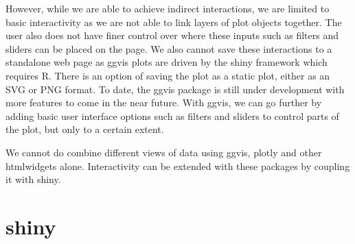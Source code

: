 \documentclass[11pt,]{report}
\newenvironment{Shaded}{\begin{snugshade}}{\end{snugshade}}
\newcommand{\KeywordTok}[1]{\textcolor[rgb]{0.13,0.29,0.53}{\textbf{#1}}}
\newcommand{\DataTypeTok}[1]{\textcolor[rgb]{0.13,0.29,0.53}{#1}}
\newcommand{\DecValTok}[1]{\textcolor[rgb]{0.00,0.00,0.81}{#1}}
\newcommand{\FloatTok}[1]{\textcolor[rgb]{0.00,0.00,0.81}{#1}}
\newcommand{\StringTok}[1]{\textcolor[rgb]{0.31,0.60,0.02}{#1}}
\newcommand{\OperatorTok}[1]{\textcolor[rgb]{0.81,0.36,0.00}{\textbf{#1}}}
\newcommand{\ErrorTok}[1]{\textcolor[rgb]{0.64,0.00,0.00}{\textbf{#1}}}
\newcommand{\NormalTok}[1]{#1}
\begin{document}
\begin{Shaded}
\end{Shaded}

However, while we are able to achieve indirect interactions, we are
limited to basic interactivity as we are not able to link layers of plot
objects together. The user also does not have finer control over where
these inputs such as filters and sliders can be placed on the page. We
also cannot save these interactions to a standalone web page as
\textsf{ggvis} plots are driven by the \textsf{shiny} framework which
requires R. There is an option of saving the plot as a static plot,
either as an SVG or PNG format. To date, the \textsf{ggvis} package is
still under development with more features to come in the near future.
With \textsf{ggvis}, we can go further by adding basic user interface
options such as filters and sliders to control parts of the plot, but
only to a certain extent.

We cannot do combine different views of data using \textsf{ggvis},
\textsf{plotly} and other htmlwidgets alone. Interactivity can be
extended with these packages by coupling it with \textsf{shiny}.

\hypertarget{shiny}{\section{shiny}\label{shiny}}
\end{document}
